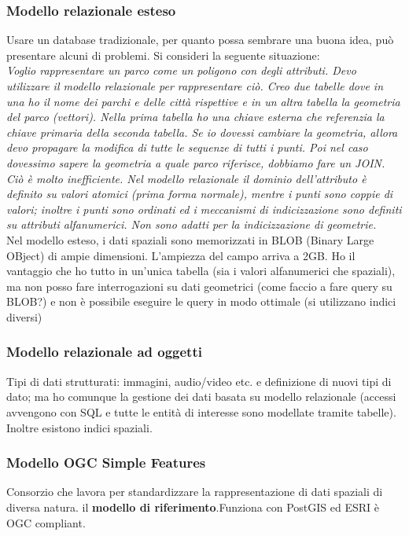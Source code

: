 \documentclass[a4paper,12pt]{article}
\begin{document}
\subsubsection{Modello relazionale esteso}
Usare un database tradizionale, per quanto possa sembrare una buona idea, può presentare alcuni di problemi. Si consideri la seguente situazione:\vspace{0.3cm}\\ 
\textit{Voglio rappresentare un parco come un poligono con degli attributi. Devo utilizzare il modello relazionale per rappresentare ciò. Creo due tabelle dove in una ho il nome dei parchi e delle città rispettive e in un altra tabella la geometria del parco (vettori). Nella prima tabella ho una chiave esterna che referenzia la chiave primaria della seconda tabella.
Se io dovessi cambiare la geometria, allora devo propagare la modifica di tutte le sequenze di tutti i punti. Poi nel caso dovessimo sapere la geometria a quale parco riferisce, dobbiamo fare un JOIN. Ciò è molto inefficiente. Nel modello relazionale il dominio dell’attributo è definito su valori atomici (prima forma normale), mentre i punti sono coppie di valori; inoltre i punti sono ordinati ed i meccanismi di indicizzazione sono definiti su attributi alfanumerici. Non sono adatti per la indicizzazione di geometrie.}\vspace{0.3cm}\\
Nel modello esteso, i dati spaziali sono memorizzati in BLOB (Binary Large OBject) di ampie dimensioni. L'ampiezza del campo arriva a 2GB. Ho il vantaggio che ho tutto in un'unica tabella (sia i valori alfanumerici che spaziali), ma non posso fare interrogazioni su dati geometrici (come faccio a fare query su BLOB?) e non è possibile eseguire le query in modo ottimale (si utilizzano indici diversi)

\subsubsection{Modello relazionale ad oggetti}
Tipi di dati strutturati: immagini, audio/video etc. e definizione di nuovi tipi di dato; ma ho comunque la gestione dei dati basata su modello relazionale (accessi avvengono con SQL e tutte le entità di interesse sono modellate tramite tabelle). Inoltre esistono indici spaziali.

\subsubsection{Modello OGC Simple Features}
Consorzio che lavora per standardizzare la rappresentazione di dati spaziali di diversa natura. \E il \textbf{modello di riferimento}.Funziona con PostGIS ed ESRI è OGC compliant.
\end{document}
